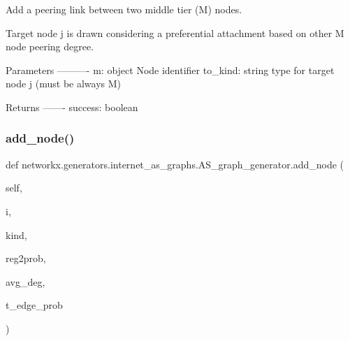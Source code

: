 \begin{DoxyVerb}Add a peering link between two middle tier (M) nodes.

Target node j is drawn considering a preferential attachment based on
other M node peering degree.

Parameters
----------
m: object
    Node identifier
to_kind: string
    type for target node j (must be always M)

Returns
-------
success: boolean
\end{DoxyVerb}
 \mbox{\label{classnetworkx_1_1generators_1_1internet__as__graphs_1_1AS__graph__generator_aad14e5ad20f531a4a28655911dc98902}} 
\subsubsection{\texorpdfstring{add\+\_\+node()}{add\_node()}}
{\footnotesize\ttfamily def networkx.\+generators.\+internet\+\_\+as\+\_\+graphs.\+A\+S\+\_\+graph\+\_\+generator.\+add\+\_\+node (\begin{DoxyParamCaption}\item[{}]{self,  }\item[{}]{i,  }\item[{}]{kind,  }\item[{}]{reg2prob,  }\item[{}]{avg\+\_\+deg,  }\item[{}]{t\+\_\+edge\+\_\+prob }\end{DoxyParamCaption})}

